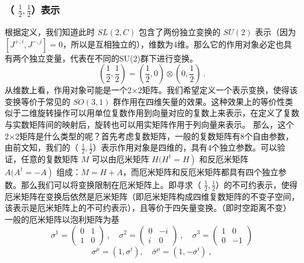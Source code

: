 \subsubsection{（ $\frac{1}{2},\frac{1}{2}$）表示}
根据定义，我们知道此时 $SL(2,C)$ 包含了两份独立变换的 $SU(2)$ 表示（因为 $[J^{+, i}, J^{-, j}]=0$，所以是互相独立的），维数为4维。那么它的作用对象必定也具有两个独立变量，代表在不同的SU(2)群下进行变换。
\begin{equation}
\left(\frac{1}{2}, \frac{1}{2}\right)=\left(\frac{1}{2}, 0\right) \otimes\left(0, \frac{1}{2}\right)~.
\end{equation}
从维数上看，作用对象可能是一个2×2矩阵。我们希望定义一个表示变换，使得该变换等价于常见的 $SO(3,1)$ 群作用在四维矢量的效果。这种效果上的等价性类似于二维旋转操作可以用单位复数作用到向量对应的复数上来表示，在定义了复数与实数矩阵间的映射后，旋转也可以用实矩阵作用于列向量来表示。
那么，这个2×2矩阵是什么类型的呢？首先考虑复数矩阵，一般的复数矩阵有8个自由参数，由前文知，我们的（ $\frac{1}{2},\frac{1}{2}$）表示作用对象是四维的，具有4个独立参数。可以验证，任意的复数矩阵 $M$ 可以由厄米矩阵 $H(\left.H^{\dagger}=H\right)$ 和反厄米矩阵 $A(\left.A^{\dagger}=-A\right)$ 组成：$M=H+A$，而厄米矩阵和反厄米矩阵都具有四个独立参数。那么我们可以将变换限制在厄米矩阵上。即寻求（ $\frac{1}{2},\frac{1}{2}$）的不可约表示，使得厄米矩阵在变换后依然是厄米矩阵（即厄米矩阵构成四维复数矩阵的不变子空间，该表示是厄米矩阵上的不可约表示），且等价于四矢量变换。（即时空距离不变）
一般的厄米矩阵以泡利矩阵为基
\begin{equation}
\sigma^{1}=\left(\begin{array}{ll}
0 & 1 \\
1 & 0
\end{array}\right)~, \quad \sigma^{2}=\left(\begin{array}{cc}
0 & -i \\
i & 0
\end{array}\right)~, \quad \sigma^{3}=\left(\begin{array}{cc}
1 & 0 \\
0 & -1
\end{array}\right)
\end{equation}
\begin{equation}
\sigma^{\mu}=\left(1, \sigma^{i}\right), \quad \bar{\sigma}^{\mu}=\left(1,-\sigma^{i}\right)~,
\end{equation}
